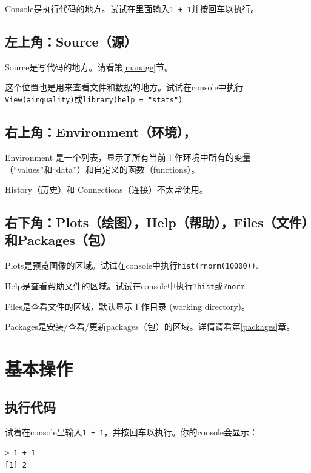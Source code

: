\documentclass[]{book}
\begin{document}
Console是执行代码的地方。试试在里面输入\texttt{1\ +\ 1}并按回车以执行。

\hypertarget{source}{%
\subsection{左上角：Source（源）}\label{source}}

Source是写代码的地方。请看第\ref{manage}节。

这个位置也是用来查看文件和数据的地方。试试在console中执行\texttt{View(airquality)}或\texttt{library(help\ =\ "stats")}.

\hypertarget{environment}{%
\subsection{右上角：Environment（环境），}\label{environment}}

Environment 是一个列表，显示了所有当前工作环境中所有的变量（``values''和``data''）和自定义的函数（functions）。

History（历史）和 Connections（连接）不太常使用。

\hypertarget{plotshelpfilespackages}{%
\subsection{右下角：Plots（绘图），Help（帮助），Files（文件）和Packages（包）}\label{plotshelpfilespackages}}

Plots是预览图像的区域。试试在console中执行\texttt{hist(rnorm(10000))}.

Help是查看帮助文件的区域。试试在console中执行\texttt{?hist}或\texttt{?norm}.

Files是查看文件的区域，默认显示工作目录 (working directory)。

Packages是安装/查看/更新packages（包）的区域。详情请看第\ref{packages}章。

\section{基本操作}

\subsection{执行代码}

试着在console里输入\texttt{1\ +\ 1}，并按回车以执行。你的console会显示：

\begin{verbatim}
> 1 + 1
[1] 2
\end{verbatim}
\end{document}
